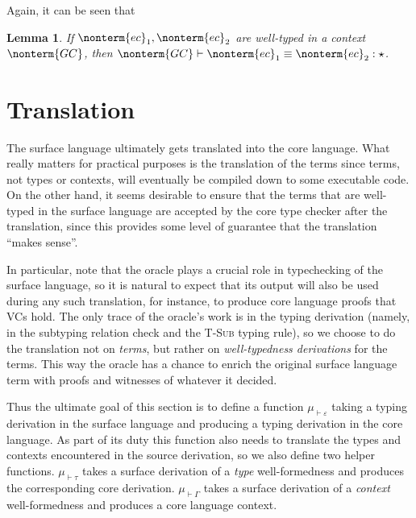 \documentclass[a4paper]{article}
\newtheorem{lemma}{Lemma}
\begin{document}
\begin{itemize}
    Again, it can be seen that
    \begin{lemma}\label{lma:equality_typing}
      If $\nonterm{ec}_1, \nonterm{ec}_2$ are well-typed in a context $\nonterm{GC}$,
      then $\nonterm{GC} \vdash \nonterm{ec}_1 \equiv \nonterm{ec}_2 : \star$.
    \end{lemma}
\end{itemize}

\section{Translation}

\newcommand{\tranty}{\mu_\tau}
\newcommand{\tranterm}{\mu_\varepsilon}

\newcommand{\Tranctx}{\mu_{\vdash\Gamma}}
\newcommand{\Tranty}{\mu_{\vdash\tau}}
\newcommand{\Tranterm}{\mu_{\vdash\varepsilon}}

The surface language ultimately gets translated into the core language.
What really matters for practical purposes is the translation of the terms since
terms, not types or contexts, will eventually be compiled down to some executable code.
On the other hand, it seems desirable to ensure that the terms
that are well-typed in the surface language
are accepted by the core type checker after the translation,
since this provides some level of guarantee that the translation ``makes sense''.

In particular, note that the oracle plays a crucial role in typechecking of the surface language,
so it is natural to expect that its output will also be used during any such translation,
for instance, to produce core language proofs that VCs hold.
The only trace of the oracle's work is in the typing derivation
(namely, in the subtyping relation check and the \textsc{T-Sub} typing rule),
so we choose to do the translation not on \emph{terms},
but rather on \emph{well-typedness derivations} for the terms.
This way the oracle has a chance to enrich the original surface language term
with proofs and witnesses of whatever it decided.

Thus the ultimate goal of this section is to define a function $\Tranterm$
taking a typing derivation in the surface language
and producing a typing derivation in the core language.
As part of its duty
this function also needs to translate the types and contexts
encountered in the source derivation,
so we also define two helper functions.
$\Tranty$ takes a surface derivation of a \emph{type} well-formedness
and produces the corresponding core derivation.
$\Tranctx$ takes a surface derivation of a \emph{context} well-formedness
and produces a core language context.
\end{document}
